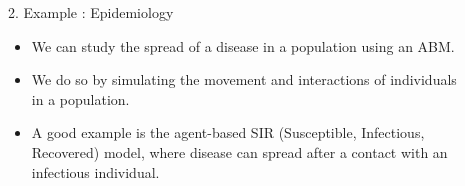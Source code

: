 \documentclass[final,hyperref={pdfpagelabels=false}]{beamer}
\newcommand{\shrink}{-15pt}
\begin{document}
\begin{frame}[t]
\begin{columns}[t]
\begin{column}{.48\textwidth}
  \end{column} %


  \begin{column}{.02\textwidth}\end{column} %

  \begin{column}{.48\textwidth} %
    \vspace{\shrink}
    \begin{block}{2. Example : Epidemiology}
      \begin{itemize}
        \item We can study the spread of a disease in a population using an ABM.
        \item We do so by simulating the movement and interactions of individuals in a population.
        \item A good example is the agent-based SIR (Susceptible, Infectious, Recovered) model, where disease can spread after a contact with an infectious individual.
        \vspace{1cm}
          \begin{figure}
            \captionsetup[subfigure]{justification=centering}
            \begin{subfigure}[t]{0.3 \columnwidth}
\end{subfigure}
\end{figure}
\end{itemize}
\end{block}
\end{column}
\end{columns}
\end{frame}
\end{document}
